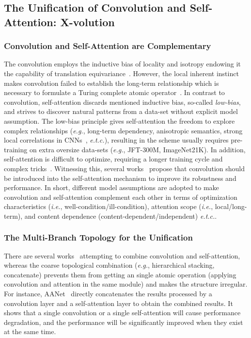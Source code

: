 \documentclass{article}
\begin{document}
\subsection{The Unification of Convolution and Self-Attention: X-volution}
\subsubsection{Convolution and Self-Attention are Complementary}
The convolution employs the inductive bias of locality and isotropy endowing it the capability of translation equivariance~\cite{DBLP:conf/iccv/BelloZLVS19}.
However, the local inherent instinct makes convolution failed to establish the long-term relationship which is necessary to formulate a Turing complete atomic operator~\cite{DBLP:conf/iclr/CordonnierLJ20,DBLP:conf/iclr/PerezMB19}. 
In contrast to convolution, self-attention discards mentioned inductive bias, so-called \emph{low-bias}, and strives to discover natural patterns from a data-set without explicit model assumption.
The low-bias principle gives self-attention the freedom to explore complex relationships (\emph{e.g.}, long-term dependency, anisotropic semantics, strong local correlations in CNNs~\cite{DBLP:journals/corr/abs-2012-09841},  \emph{e.t.c.}), resulting in the scheme usually requires pre-training on extra oversize data-sets (\emph{e.g.}, JFT-300M, ImageNet21K).
In addition, self-attention is difficult to optimize, requiring a longer training cycle and complex tricks~\cite{DBLP:journals/corr/abs-2103-12731,DBLP:journals/corr/abs-2103-14030,DBLP:journals/corr/abs-2010-04159,DBLP:conf/eccv/CarionMSUKZ20}.
Witnessing this, several works~\cite{DBLP:conf/iccv/BelloZLVS19,DBLP:journals/corr/abs-2103-15808} propose that convolution should be introduced into the self-attention mechanism to improve its robustness and performance.
In short, different model assumptions are adopted to make convolution and self-attention complement each other in terms of optimization characteristics (\emph{i.e.}, well-condition/ill-condition), attention scope (\emph{i.e.}, local/long-term), and content dependence (content-dependent/independent) \emph{e.t.c.}.


\subsubsection{The Multi-Branch Topology for the Unification}

There are several works~\cite{DBLP:journals/corr/abs-2103-15808,DBLP:conf/iccv/BelloZLVS19} attempting to combine convolution and self-attention, whereas the coarse topological combination (\emph{e.g.}, hierarchical stacking, concatenate) prevents them from getting an single atomic operation (applying convolution and attention in the same module) and makes the structure irregular.
For instance, AANet~\cite{DBLP:conf/iccv/BelloZLVS19} directly concatenates the results processed by a convolution layer and a self-attention layer to obtain the combined results.
It shows that a single convolution or a single self-attention will cause performance degradation, and the performance will be significantly improved when they exist at the same time.
\end{document}
